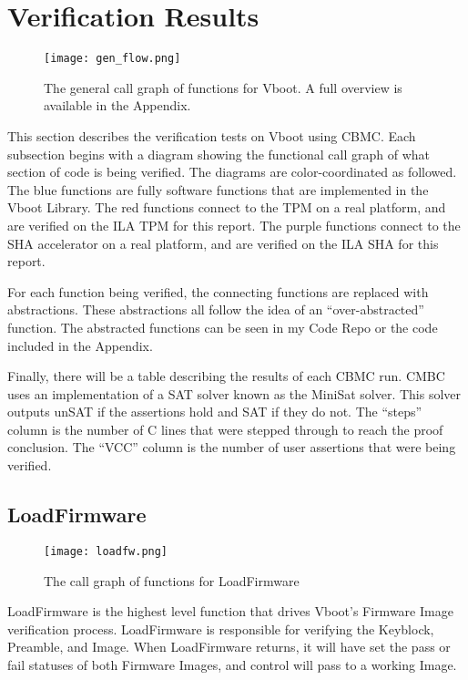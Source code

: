 \chapter{Verification Results}\label{sec:VerifResults}

 \begin{figure}[!htbp]
   \centering
   \texttt{[image: gen\_flow.png]}
   \caption[Vboot General Call Graph]{The general call graph of functions for Vboot. A full overview is available in the Appendix.}\label{fig:allflow}
 \end{figure}

This section describes the verification tests on Vboot using CBMC\@.
Each subsection begins with a diagram showing the functional call graph of what section of code is being verified.
The diagrams are color-coordinated as followed.
The blue functions are fully software functions that are implemented in the Vboot Library.
The red functions connect to the TPM on a real platform, and are verified on the
ILA TPM for this report.
The purple functions connect to the SHA accelerator on a real platform, and 
are verified on the ILA SHA for this report.

For each function being verified, the connecting functions are replaced with
abstractions.
These abstractions all follow the idea of an ``over-abstracted'' function.
The abstracted functions can be seen in my Code Repo or the code included in the
Appendix.

Finally, there will be a table describing the results of each CBMC run.
CMBC uses an implementation of a SAT solver known as the MiniSat solver\cite{minisat}.
This solver outputs unSAT if the assertions hold and SAT if they do not. 
The ``steps'' column is the number of C lines that were stepped through to reach the proof conclusion.
The ``VCC'' column is the number of user assertions that were being verified.

\section{LoadFirmware}

\begin{figure}[!htbp]
  \centering
  \texttt{[image: loadfw.png]}
  \caption[LoadFirmware Call Graph]{The call graph of functions for LoadFirmware}\label{fig:loadfw}
\end{figure}

LoadFirmware is the highest level function that drives Vboot's Firmware Image
verification process.
LoadFirmware is responsible for verifying the Keyblock, Preamble, and Image.
When LoadFirmware returns, it will have set the pass or fail statuses of both Firmware Images, and control will pass to a working Image.

